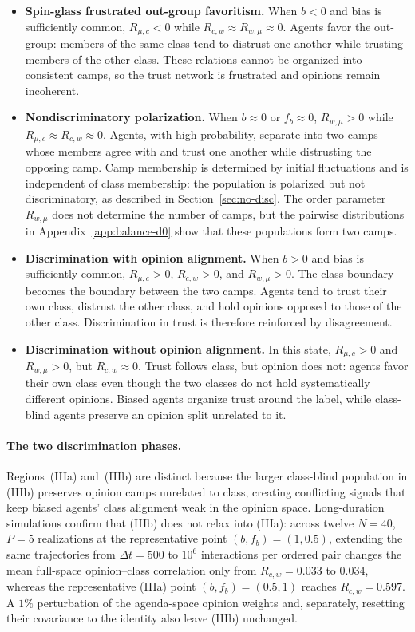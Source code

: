 \documentclass{article}
\newcommand{\Rwmu}{R_{w,\mu}}
\newcommand{\Rmuc}{R_{\mu,c}}
\newcommand{\Rcw}{R_{c,w}}
\newcommand{\fb}{f_{b}}
\begin{document}
\begin{itemize}
\item[(I)] \textbf{Spin-glass frustrated out-group favoritism.} When $b<0$ and bias is
  sufficiently common, $\Rmuc<0$ while $\Rcw\approx\Rwmu\approx0$. Agents favor
  the out-group: members of the same class tend to distrust one another while
  trusting members of the other class. These relations cannot be organized into
  consistent camps, so the trust network is frustrated and opinions remain
  incoherent.

\item[(II)] \textbf{Nondiscriminatory polarization.} When $b\approx0$ or
  $\fb\approx0$, $\Rwmu>0$ while $\Rmuc\approx\Rcw\approx0$. Agents, with high probability, separate into
  two camps whose members agree with and trust one another while distrusting the
  opposing camp. Camp membership is determined
 by initial fluctuations and is independent of class membership: the population
  is polarized but not discriminatory, as described in
  Section~\ref{sec:no-disc}. The order parameter $\Rwmu$ does not determine the number of camps, but the pairwise distributions in Appendix~\ref{app:balance-d0} show that these populations form two camps.

\item[(IIIa)] \textbf{Discrimination with opinion alignment.} When $b>0$ and
  bias is sufficiently common, $\Rmuc>0$, $\Rcw>0$, and $\Rwmu>0$. The class
  boundary becomes the boundary between the two camps. Agents tend to trust their
  own class, distrust the other class, and hold opinions opposed to those of the
  other class. Discrimination in trust is therefore reinforced by disagreement.

\item[(IIIb)] \textbf{Discrimination without opinion alignment.} In this state,
  $\Rmuc>0$ and $\Rwmu>0$, but $\Rcw\approx0$. Trust follows class, but opinion
  does not: agents favor their own class even though the two classes do not hold
  systematically different opinions. Biased agents organize trust around the
  label, while class-blind agents preserve an opinion split unrelated to it.

\end{itemize}

\paragraph{The two discrimination phases.} Regions~(IIIa) and~(IIIb) are
distinct because the larger class-blind population in (IIIb) preserves opinion
camps unrelated to class, creating conflicting signals that keep biased agents'
class alignment weak in the opinion space. Long-duration simulations confirm
that (IIIb) does not relax into (IIIa): across twelve $N=40$, $P=5$
realizations at
the representative point $(b,\fb)=(1,0.5)$, extending the same trajectories from
$\Delta t=500$ to $10^6$ interactions per ordered pair changes the mean
full-space opinion--class correlation only from $\Rcw=0.033$ to $0.034$, whereas
the representative (IIIa) point $(b,\fb)=(0.5,1)$ reaches $\Rcw=0.597$. A $1\%$
perturbation of the agenda-space opinion weights and, separately, resetting their
covariance to the identity also leave (IIIb) unchanged.
\end{document}
